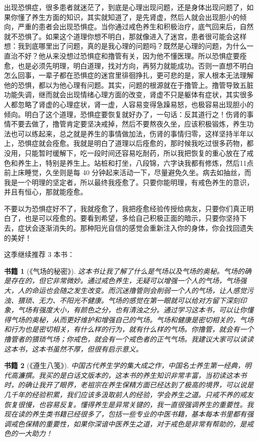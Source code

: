 \documentclass{ctexart}
\newtheorem{book}{书籍}
\begin{document}
出现恐惧症，很多患者就迷茫了，到底是心理出现问题，还是身体出现问题了，如果你懂了养生方面的知识，其实就知道了，是先肾虚，然后人就会出现胆小的倾向，严重的患者会出现恐惧症。当你通过戒色养生和积极治疗，底气回来后，自然就不恐惧了。如果这个道理你想不明白，那就像进入了迷宫，患者很可能会这样想：我到底哪里出了问题，真的是我心理的问题吗？既然是心理的问题，为什么一直治不好？他从来没想过恐惧症和撸管有关，因为他不懂医理。所以恐惧症要痊愈，也是必须先明理，明白道理，找对方向，再努力就能成功。否则一直想不明白怎么回事，一辈子都在恐惧症的迷宫里徘徊挣扎，更可悲的是，家人根本无法理解他的恐惧，都以为他心理有问题。其实，问题的根源就在于撸管上。撸管导致五脏功能失调，继而就会出现情绪心理方面的改变，肾虚不只是躯体有症状，其实很多人都忽略了肾虚的心理症状，肾一虚，人容易变得急躁易怒，也极容易出现胆小的倾向。明白了这个道理，恐惧症要恢复就好办了，一句话：反其道行之！伤肾的事情不要去做了，撸管肯定要坚决戒掉，然后不要熬夜久坐，应该积极锻炼，养生功法也可以练起来，总之就是养生的事情做加法，伤肾的事情归零，这样坚持半年以上，恐惧症就会痊愈。我就是明白了道理以后痊愈的，那时候我吃过很多药物，都没用，只能暂时缓解下，吃一段时间还容易吃耐药，所以我把恢复的重心放在了戒色和养生上，特别是养生上。站桩和打坐，八段锦，六字诀我都有修炼，然后11点前上床睡觉，久坐则是每 40 分钟起来活动一下，尽量避免久坐。病去如抽丝，而我是一个明理的坚定者，所以最终我痊愈了。只要你能明理，有戒色养生的意识，并且有恒心，那就能痊愈。

不要以为恐惧症好不了，我就痊愈了，我把痊愈经验传授给病友，只要你们真正明白了，也是可以痊愈的。要看到希望，多给自己积极正面的暗示，只要你坚持下去，症状会逐渐消失的。那种阳光自信的感觉会重新注入你的身体，你会找回遗失的美好！

这季继续推荐 3 本书：

\begin{book}[《气场的秘密》]
    这本书让我了解了什么是气场以及气场的奥秘。气场的确是存在的，但它非常微妙。通过戒色养生，无疑可以增强一个人的气场，气场强大，人的命运也会随之发生改变。而沉迷撸管则会削弱一个人的气场，让人感觉污浊、猥琐、无力、不阳光不健康。气场的感觉在第一眼就可以给对方留下深刻印象，气场有强度大小，有颜色之分，也有清浊之分。通过学习这本书，可以让你懂得气场的奥秘，从而更好维护和增强自己的气场。气场和健康是密切相关的，气场和行为也是密切相关，有什么样的行为，就有什么样的气场。你撸管，就会有一个撸管者的猥琐气场；你戒色，就会有一个戒色者的正气气场。我建议大家可以读读这本书，这本书虽然不厚，但很有启示意义。
\end{book}

\begin{book}[《遵生八笺》]
    中国古代养生学的集大成之作，中国名士养生第一经典，明代高濂撰。我买的是白话文版本的，这本书的养生知识非常丰富，当初读这本书时，的确让我开了眼界，老祖宗在养生保精方面已经达到了极高的境界，可以说是几千年的经验积累，我们应该多汲取前人的经验，学会养生之道。只戒不养的戒友恢复很慢，也容易反复。懂得养生是异常关键的，我一直很强调养生的重要性。我现在读的养生类书籍已经很多了，包括一些专业的中医书籍，基本每本书里都有强调戒色保精的重要性，如果你深谙中医养生之道，对于戒色是非常有帮助的，是戒色的一大助力！
\end{book}
\end{document}
